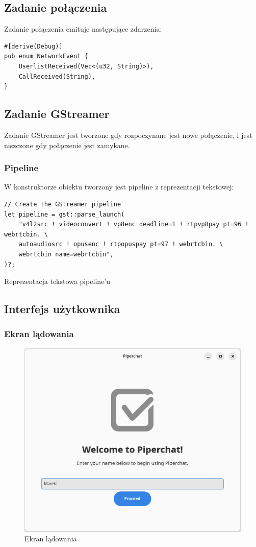 \subsection{Zadanie połączenia}

Zadanie połączenia emituje następujące zdarzenia:

\begin{verbatim}
#[derive(Debug)]
pub enum NetworkEvent {
    UserlistReceived(Vec<(u32, String)>),
    CallReceived(String),
}
\end{verbatim}

\subsection{Zadanie GStreamer}

Zadanie GStreamer jest tworzone gdy rozpoczynane jest nowe połączenie, i jest niszczone gdy
połączenie jest zamykane.

\subsubsection{Pipeline}

W konstruktorze obiektu tworzony jest pipeline z reprezentacji tekstowej:

\begin{listing}[H]
	\begin{verbatim}
// Create the GStreamer pipeline
let pipeline = gst::parse_launch(
	"v4l2src ! videoconvert ! vp8enc deadline=1 ! rtpvp8pay pt=96 ! webrtcbin. \
	autoaudiosrc ! opusenc ! rtpopuspay pt=97 ! webrtcbin. \
	webrtcbin name=webrtcbin",
)?;
\end{verbatim}
	\caption{Reprezentacja tekstowa pipeline'u}
\end{listing}

\subsection{Interfejs użytkownika}

\subsubsection{Ekran lądowania}

\begin{figure}[H]
	\centering
	\includegraphics[width=.6\textwidth]{img/gui/screen_landing}
	\caption{Ekran lądowania}
\end{figure}

